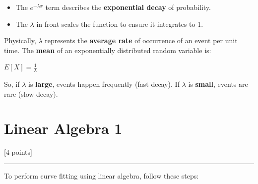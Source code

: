 \documentclass[11pt]{article}
\providecommand{\tightlist}{%
      \setlength{\itemsep}{0pt}\setlength{\parskip}{0pt}}
\begin{document}
\begin{itemize}
\tightlist
\item
  The \textbf{\(e^{-\lambda x}\)} term describes the \textbf{exponential
  decay} of probability.
\item
  The \textbf{\(\lambda\)} in front scales the function to ensure it
  integrates to 1.
\end{itemize}

Physically, \(\lambda\) represents the \textbf{average rate} of
occurrence of an event per unit time. The \textbf{mean} of an
exponentially distributed random variable is:

\(E[X] = \frac{1}{\lambda}\)

So, if \(\lambda\) is \textbf{large}, events happen frequently (fast
decay). If \(\lambda\) is \textbf{small}, events are rare (slow decay).

    \section{Linear Algebra 1}\label{linear-algebra-1}

{[}4 points{]}

    \begin{center}\rule{0.5\linewidth}{0.5pt}\end{center}

To perform curve fitting using linear algebra, follow these steps:
\end{document}
